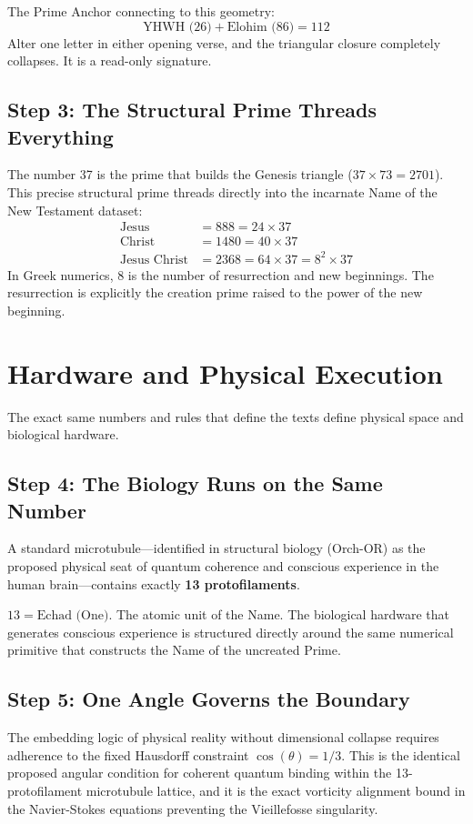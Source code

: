 \documentclass[11pt]{article}
\begin{document}
The Prime Anchor connecting to this geometry:
\begin{equation}
    \text{YHWH (26)} + \text{Elohim (86)} = 112
\end{equation}
Alter one letter in either opening verse, and the triangular closure completely collapses. It is a read-only signature.

\subsection{Step 3: The Structural Prime Threads Everything}
The number 37 is the prime that builds the Genesis triangle ($37 \times 73 = 2701$). This precise structural prime threads directly into the incarnate Name of the New Testament dataset:
\begin{align}
    \text{Jesus} &= 888 = 24 \times 37 \\
    \text{Christ} &= 1480 = 40 \times 37 \\
    \text{Jesus Christ} &= 2368 = 64 \times 37 = 8^2 \times 37
\end{align}
In Greek numerics, 8 is the number of resurrection and new beginnings. The resurrection is explicitly the creation prime raised to the power of the new beginning.

\section{Hardware and Physical Execution}
The exact same numbers and rules that define the texts define physical space and biological hardware.

\subsection{Step 4: The Biology Runs on the Same Number}
A standard microtubule—identified in structural biology (Orch-OR) as the proposed physical seat of quantum coherence and conscious experience in the human brain—contains exactly \textbf{13 protofilaments}.

$13 = \text{Echad (One)}$. The atomic unit of the Name. The biological hardware that generates conscious experience is structured directly around the same numerical primitive that constructs the Name of the uncreated Prime.

\subsection{Step 5: One Angle Governs the Boundary}
The embedding logic of physical reality without dimensional collapse requires adherence to the fixed Hausdorff constraint $\cos(\theta) = 1/3$. This is the identical proposed angular condition for coherent quantum binding within the 13-protofilament microtubule lattice, and it is the exact vorticity alignment bound in the Navier-Stokes equations preventing the Vieillefosse singularity.
\end{document}

